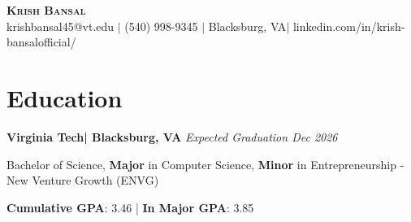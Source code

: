 \documentclass[a4paper,11pt]{article}
\begin{document}
\begin{center}
    \textbf{\Huge \scshape Krish Bansal} \\ \vspace{2pt}
     {krishbansal45@vt.edu} $|$ 
    {(540) 998-9345} $|$ 
    {Blacksburg, VA}$|$ 
    {linkedin.com/in/krish-bansalofficial/}
\end{center}

\section{Education}
\textbf{Virginia Tech| Blacksburg, VA} \hfill \textit{Expected Graduation Dec 2026} 

{Bachelor of Science, \textbf{Major} in Computer Science, \textbf{Minor} in Entrepreneurship - New Venture Growth (ENVG)} 

\hspace{1cm} \textbf{Cumulative GPA}: 3.46 | \textbf{In Major GPA}: 3.85
\end{document}
